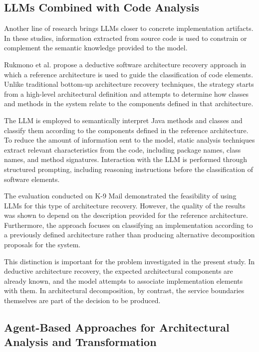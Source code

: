 \documentclass[acmsmall,screen,anonymous,review]{acmart}
\begin{document}
\subsection{LLMs Combined with Code Analysis}

Another line of research brings LLMs closer to concrete implementation artifacts. In these studies, information extracted from source code is used to constrain or complement the semantic knowledge provided to the model.

Rukmono et al. propose a deductive software architecture recovery approach in which a reference architecture is used to guide the classification of code elements. Unlike traditional bottom-up architecture recovery techniques, the strategy starts from a high-level architectural definition and attempts to determine how classes and methods in the system relate to the components defined in that architecture.

The LLM is employed to semantically interpret Java methods and classes and classify them according to the components defined in the reference architecture. To reduce the amount of information sent to the model, static analysis techniques extract relevant characteristics from the code, including package names, class names, and method signatures. Interaction with the LLM is performed through structured prompting, including reasoning instructions before the classification of software elements.

The evaluation conducted on K-9 Mail demonstrated the feasibility of using LLMs for this type of architecture recovery. However, the quality of the results was shown to depend on the description provided for the reference architecture. Furthermore, the approach focuses on classifying an implementation according to a previously defined architecture rather than producing alternative decomposition proposals for the system.

This distinction is important for the problem investigated in the present study. In deductive architecture recovery, the expected architectural components are already known, and the model attempts to associate implementation elements with them. In architectural decomposition, by contrast, the service boundaries themselves are part of the decision to be produced.

\subsection{Agent-Based Approaches for Architectural Analysis and Transformation}
\end{document}
